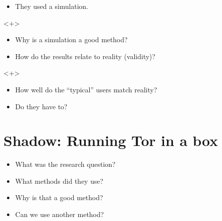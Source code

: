 \begin{frame}
  \begin{solution}
    \begin{itemize}
      \item They used a simulation.
    \end{itemize}
  \end{solution}

  \begin{uncoverenv}<+>
    \begin{question}
      \begin{itemize}
        \item Why is a simulation a good method?
        \item How do the results relate to reality (validity)?
      \end{itemize}
    \end{question}
  \end{uncoverenv}

  \begin{uncoverenv}<+>
    \begin{question}
      \begin{itemize}
        \item How well do the \enquote{typical} users match reality?
        \item Do they have to?
      \end{itemize}
    \end{question}
  \end{uncoverenv}
\end{frame}


\section{Shadow: Running Tor in a box}

\begin{frame}
  \begin{question}
    \begin{itemize}
      \item What was the research question?
      \item What methods did they use?
      \item Why is that a good method?
      \item Can we use another method?
    \end{itemize}
  \end{question}
\end{frame}

